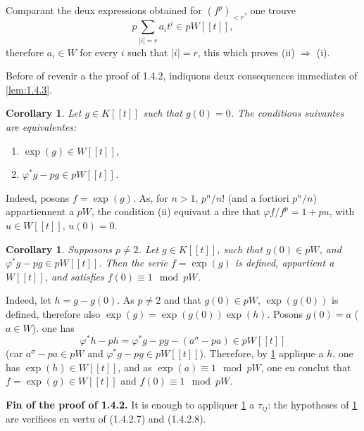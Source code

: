 \documentclass[12pt,a4paper]{article}
\theoremstyle{plain}
\newtheorem{corollary}[theorem]{Corollary}
\theoremstyle{definition}
\theoremstyle{remark}
\begin{document}
Comparant the deux expressions obtained for $(f^p)_{<r}$, one trouve
\[
p\sum_{|i|=r} a_i t^i \in pW[[t]],
\]
therefore $a_i \in W$ for every $i$ such that $|i| = r$, this which proves (ii) $\Rightarrow$ (i).

Before of revenir a the proof of 1.4.2, indiquons deux consequences immediates of \ref{lem:1.4.3}.

\begin{corollary}\label{cor:1.4.4}
Let $g \in K[[t]]$ such that $g(0) = 0$. The conditions suivantes are equivalentes:
\begin{enumerate}[label=(\roman*)]
\item $\exp(g) \in W[[t]]$,
\item $\varphi^*g - pg \in pW[[t]]$.
\end{enumerate}
\end{corollary}

Indeed, posons $f = \exp(g)$. As, for $n > 1$, $p^n/n!$ (and a fortiori $p^n/n$) appartiennent a $pW$, the condition (ii) equivaut a dire that $\varphi f/f^p = 1 + pu$, with $u \in W[[t]]$, $u(0) = 0$.

\begin{corollary}\label{cor:1.4.5}
Supposons $p \neq 2$. Let $g \in K[[t]]$, such that $g(0) \in pW$, and $\varphi^*g - pg \in pW[[t]]$. Then the serie $f = \exp(g)$ is defined, appartient a $W[[t]]$, and satisfies $f(0) \equiv 1 \mod pW$.
\end{corollary}

Indeed, let $h = g - g(0)$. As $p \neq 2$ and that $g(0) \in pW$, $\exp(g(0))$ is defined, therefore also $\exp(g) = \exp(g(0))\exp(h)$. Posons $g(0) = a$ ($a \in W$). one has
\[
\varphi^*h - ph = \varphi^*g - pg - (a^\sigma - pa) \in pW[[t]]
\]
(car $a^\sigma - pa \in pW$ and $\varphi^*g - pg \in pW[[t]]$). Therefore, by \ref{cor:1.4.4} applique a $h$, one has $\exp(h) \in W[[t]]$, and as $\exp(a) \equiv 1 \mod pW$, one en conclut that $f = \exp(g) \in W[[t]]$ and $f(0) \equiv 1 \mod pW$.

\textbf{Fin of the proof of 1.4.2.} It is enough to appliquer \ref{cor:1.4.5} a $\tau_{ij}$: the hypotheses of \ref{cor:1.4.5} are verifiees en vertu of (1.4.2.7) and (1.4.2.8).
\end{document}
